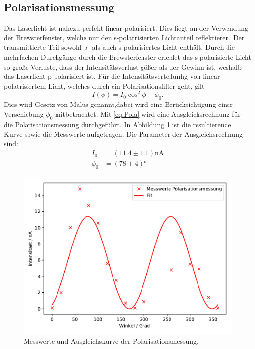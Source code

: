 \subsection{Polarisationsmessung}
Das Laserlicht ist nahezu perfekt linear polarisiert. Dies liegt an der Verwendung der
Brewsterfenster, welche nur den s-polatrisierten Lichtanteil reflektieren. Der
transmittierte Teil sowohl p- als auch s-polarisiertes Licht enthält. Durch die
mehrfachen Durchgänge durch die Brewsterfenster erleidet das s-polarisierte Licht
so große Verluste, dass der Intensitätsverlust gößer als der Gewinn ist, weshalb
das Laserlicht p-polarisiert ist.
Für die Intensitätsverteilunhg von linear polatrisiertem Licht, welches durch ein
Polarisationsfilter geht, gilt
\begin{equation}
  I(\phi)=I_0 \cos^2{\phi-\phi_0} .
  \label{eq:Pola}
\end{equation}
Dies wird Gesetz von Malus genannt,dabei wird eine Berücksichtigung einer Verschiebung $\phi_0$
mitbetrachtet.
Mit \ref{eq:Pola} wird eine Ausgleichsrechnung für die Polarisationsmessung durchgeführt.
In Abbildung \ref{fig:Pola} ist die resultierende Kurve sowie die Messwerte aufgetragen.
Die Parameter der Ausgleichsrechnung sind:
\begin{align*}
  I_0&=(11.4 \pm 1.1)\text{nA} \\
  \phi_0&=(78 \pm 4)°
\end{align*}
\begin{figure}[H]
  \centering
  \includegraphics{plots/Polarisation.pdf}
  \caption{Messwerte und Ausgleichskurve der Polarisationsmessung.}
  \label{fig:Pola}
\end{figure}
